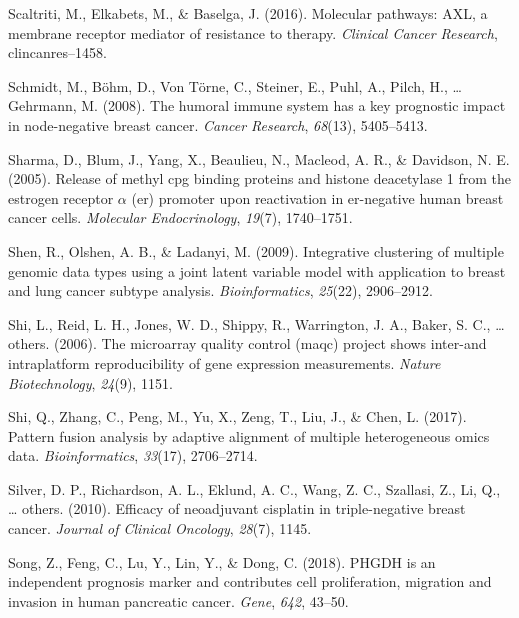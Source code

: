 \documentclass[12pt,twoside]{reedthesis}
\begin{document}
\leavevmode\hypertarget{ref-scaltriti2016molecular}{}%
Scaltriti, M., Elkabets, M., \& Baselga, J. (2016). Molecular pathways: AXL, a membrane receptor mediator of resistance to therapy. \emph{Clinical Cancer Research}, clincanres--1458.

\leavevmode\hypertarget{ref-schmidt2008humoral}{}%
Schmidt, M., Böhm, D., Von Törne, C., Steiner, E., Puhl, A., Pilch, H., \ldots{} Gehrmann, M. (2008). The humoral immune system has a key prognostic impact in node-negative breast cancer. \emph{Cancer Research}, \emph{68}(13), 5405--5413.

\leavevmode\hypertarget{ref-sharma2005release}{}%
Sharma, D., Blum, J., Yang, X., Beaulieu, N., Macleod, A. R., \& Davidson, N. E. (2005). Release of methyl cpg binding proteins and histone deacetylase 1 from the estrogen receptor \(\alpha\) (er) promoter upon reactivation in er-negative human breast cancer cells. \emph{Molecular Endocrinology}, \emph{19}(7), 1740--1751.

\leavevmode\hypertarget{ref-shen2009integrative}{}%
Shen, R., Olshen, A. B., \& Ladanyi, M. (2009). Integrative clustering of multiple genomic data types using a joint latent variable model with application to breast and lung cancer subtype analysis. \emph{Bioinformatics}, \emph{25}(22), 2906--2912.

\leavevmode\hypertarget{ref-shi2006microarray}{}%
Shi, L., Reid, L. H., Jones, W. D., Shippy, R., Warrington, J. A., Baker, S. C., \ldots{} others. (2006). The microarray quality control (maqc) project shows inter-and intraplatform reproducibility of gene expression measurements. \emph{Nature Biotechnology}, \emph{24}(9), 1151.

\leavevmode\hypertarget{ref-shi2017pattern}{}%
Shi, Q., Zhang, C., Peng, M., Yu, X., Zeng, T., Liu, J., \& Chen, L. (2017). Pattern fusion analysis by adaptive alignment of multiple heterogeneous omics data. \emph{Bioinformatics}, \emph{33}(17), 2706--2714.

\leavevmode\hypertarget{ref-silver2010efficacy}{}%
Silver, D. P., Richardson, A. L., Eklund, A. C., Wang, Z. C., Szallasi, Z., Li, Q., \ldots{} others. (2010). Efficacy of neoadjuvant cisplatin in triple-negative breast cancer. \emph{Journal of Clinical Oncology}, \emph{28}(7), 1145.

\leavevmode\hypertarget{ref-song2018phgdh}{}%
Song, Z., Feng, C., Lu, Y., Lin, Y., \& Dong, C. (2018). PHGDH is an independent prognosis marker and contributes cell proliferation, migration and invasion in human pancreatic cancer. \emph{Gene}, \emph{642}, 43--50.
\end{document}
